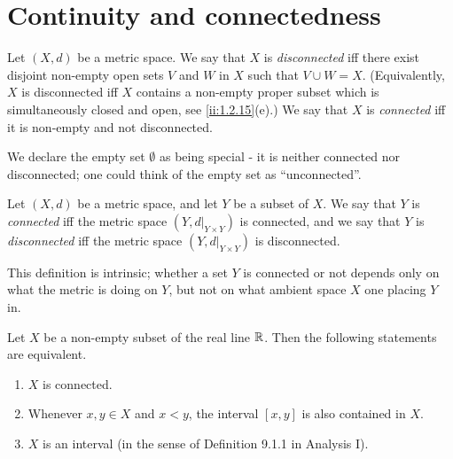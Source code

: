 \section{Continuity and connectedness}\label{ii:sec:2.4}

\begin{defn}\label{ii:2.4.1}
  Let \((X, d)\) be a metric space.
  We say that \(X\) is \emph{disconnected} iff there exist disjoint non-empty open sets \(V\) and \(W\) in \(X\) such that \(V \cup W = X\).
  (Equivalently, \(X\) is disconnected iff \(X\) contains a non-empty proper subset which is simultaneously closed and open, see \cref{ii:1.2.15}(e).)
  We say that \(X\) is \emph{connected} iff it is non-empty and not disconnected.
\end{defn}

\begin{note}
  We declare the empty set \(\emptyset\) as being special
  - it is neither connected nor disconnected;
  one could think of the empty set as ``unconnected''.
\end{note}

\setcounter{thm}{2}
\begin{defn}\label{ii:2.4.3}
  Let \((X, d)\) be a metric space, and let \(Y\) be a subset of \(X\).
  We say that \(Y\) is \emph{connected} iff the metric space \((Y, d|_{Y \times Y})\) is connected, and we say that \(Y\) is \emph{disconnected} iff the metric space \((Y, d|_{Y \times Y})\) is disconnected.
\end{defn}

\begin{rmk}\label{ii:2.4.4}
  This definition is intrinsic;
  whether a set \(Y\) is connected or not depends only on what the metric is doing on \(Y\), but not on what ambient space \(X\) one placing \(Y\) in.
\end{rmk}

\begin{thm}\label{ii:2.4.5}
  Let \(X\) be a non-empty subset of the real line \(\mathbb{R}\).
  Then the following statements are equivalent.
  \begin{enumerate}
    \item \(X\) is connected.
    \item Whenever \(x, y \in X\) and \(x < y\), the interval \([x, y]\) is also contained in \(X\).
    \item \(X\) is an interval (in the sense of Definition 9.1.1 in Analysis I).
  \end{enumerate}
\end{thm}

